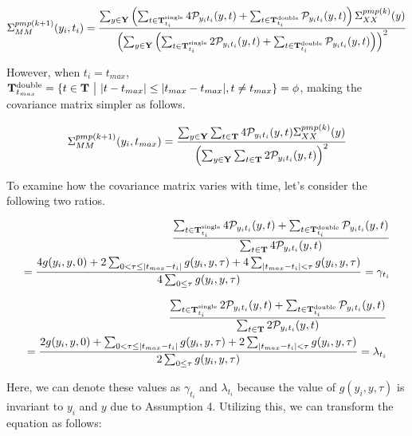 \begin{align}
\Sigma^{pmp(k+1)}_{MM}(y_i,t_i) = {\sum_{y\in \bold{Y}}\left(\sum_{t\in\bold{T}_{t_i}^{\text{single}}}4\mathcal{P}_{y_i t_i}(y, t)+\sum_{t\in\bold{T}_{t_i}^{\text{double}}}\mathcal{P}_{y_i t_i}(y, t)\right)\Sigma^{pmp(k)}_{XX}(y)
\over
\left(\sum_{y\in \bold{Y}}\left(\sum_{t\in\bold{T}_{t_i}^{\text{single}}}2\mathcal{P}_{y_i t_i}(y, t)+\sum_{t\in\bold{T}_{t_i}^{\text{double}}}\mathcal{P}_{y_i t_i}(y, t)\right)\right)^2}
\end{align}

However, when $t_i=t_{max}$, $\bold{T}_{t_{max}}^{\text{double}}= \{t \in \bold{T}\ \big | \ |t- t_{max}|\le|t_{max}-t_{max}|, t\neq t_{max}\}=\phi$, making the covariance matrix simpler as follows.

\begin{align}
\Sigma^{pmp(k+1)}_{MM}(y_i,t_{max})= {\sum_{y\in \bold{Y}}\sum_{t\in\bold{T}}4\mathcal{P}_{y_i t_i}(y, t)\Sigma_{XX}^{pmp(k)}(y)
\over
\left(\sum_{y\in \bold{Y}}\sum_{t\in\bold{T}}2\mathcal{P}_{y_i t_i}(y, t)\right)^2}
\end{align}

To examine how the covariance matrix varies with time, let's consider the following two ratios.

\begin{align}
{\sum_{t\in\bold{T}_{t_i}^{\text{single}}}4\mathcal{P}_{y_i t_i}(y, t)+\sum_{t\in\bold{T}_{t_i}^{\text{double}}}\mathcal{P}_{y_i t_i}(y, t)\over \sum_{t\in\bold{T}}4\mathcal{P}_{y_i t_i}(y, t)}\\={4g(y_i, y, 0)+2\sum_{0<\tau\le |t_{max}-t_i|}g(y_i, y, \tau)+4\sum_{|t_{max}-t_i|<\tau}g(y_i, y, \tau)\over 4\sum_{0\le\tau}g(y_i,y,\tau)}=\gamma_{t_i}
\end{align}

\begin{align}
{\sum_{t\in\bold{T}_{t_i}^{\text{single}}}2\mathcal{P}_{y_i t_i}(y, t)+\sum_{t\in\bold{T}_{t_i}^{\text{double}}}\mathcal{P}_{y_i t_i}(y, t)\over \sum_{t\in\bold{T}}2\mathcal{P}_{y_i t_i}(y, t)}\\={2g(y_i, y, 0)+\sum_{0<\tau\le |t_{max}-t_i|}g(y_i, y, \tau)+2\sum_{|t_{max}-t_i|<\tau}g(y_i, y, \tau)\over 2\sum_{0\le\tau}g(y_i,y,\tau)}=\lambda_{t_i}
\end{align}

Here, we can denote these values as $\gamma_{t_i}$ and $\lambda_{t_i}$ because the value of $g(y_i, y, \tau)$ is invariant to $y_i$ and $y$ due to Assumption 4. Utilizing this, we can transform the equation as follows:

